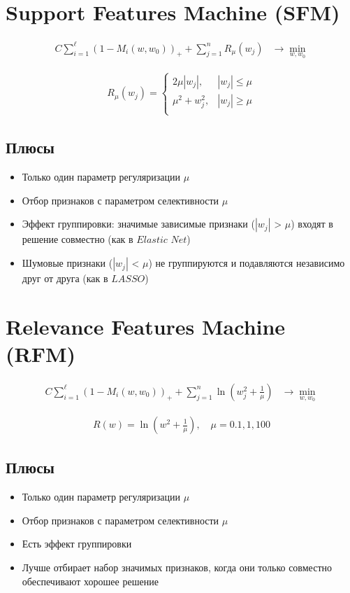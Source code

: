 \section{Support Features Machine (SFM)}

\begin{align*}
    C \sum_{i=1}^{\ell} \left(1 - M_i(w, w_0)\right)_+ + \sum_{j=1}^{n} R_{\mu}(w_{j}) & \rightarrow \min_{w, w_0}
\end{align*}

\begin{align*}
R_{\mu}(w_j)=
    \begin{cases}
        2\mu |w_j|, & |w_j| \leq \mu\\
        \mu^2 + w_j^2, & |w_j| \geq \mu \\
    \end{cases}
\end{align*}

\subsection*{Плюсы}
\begin{itemize}
    \item Только один параметр регуляризации \(\mu\)
    \item Отбор признаков с параметром селективности \(\mu\)
    \item Эффект группировки: значимые зависимые признаки ($|w_j|$ > \(\mu\)) входят в решение совместно (как в $Elastic$ $Net$)
    \item Шумовые признаки ($|w_j|$ < \(\mu\)) не группируются и подавляются независимо друг от друга (как в $LASSO$)
\end{itemize}

\section{Relevance Features Machine (RFM)}

\begin{align*}
    C \sum_{i=1}^{\ell} \left(1 - M_i(w, w_0)\right)_+ + \sum_{j=1}^{n} \ln(w_j^2 + \frac{1}{\mu}) & \rightarrow \min_{w, w_0}
\end{align*}

\begin{align*}
    R(w) = \ln(w^2 + \frac{1}{\mu}), \quad \mu = 0.1, 1, 100
\end{align*}

\subsection*{Плюсы}
\begin{itemize}
    \item Только один параметр регуляризации \(\mu\)
    \item Отбор признаков с параметром селективности \(\mu\)
    \item Есть эффект группировки
    \item Лучше отбирает набор значимых признаков, когда они только совместно обеспечивают хорошее решение
\end{itemize}

